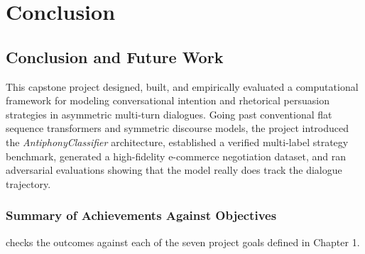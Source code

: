 \chapter{Conclusion}
\label{ch:conclusion}

\section{Conclusion and Future Work}
\label{sec:conclusion}

This capstone project designed, built, and empirically evaluated a computational framework for modeling conversational intention and rhetorical persuasion strategies in asymmetric multi-turn dialogues. Going past conventional flat sequence transformers and symmetric discourse models, the project introduced the \textit{AntiphonyClassifier} architecture, established a verified multi-label strategy benchmark, generated a high-fidelity e-commerce negotiation dataset, and ran adversarial evaluations showing that the model really does track the dialogue trajectory.

\subsection{Summary of Achievements Against Objectives}
 checks the outcomes against each of the seven project goals defined in Chapter 1.

